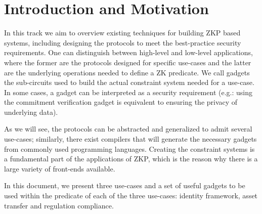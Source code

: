 \section{Introduction and Motivation}
\label{apps:intro}
 
In this track we aim to overview existing techniques for building ZKP based systems, including designing the protocols to meet the best-practice security requirements. One can distinguish between high-level and low-level applications, where the former are the protocols designed for specific use-cases and the latter are the underlying operations needed to define a ZK predicate. We call gadgets the sub-circuits used to build the actual constraint system needed for a use-case. In some cases, a gadget can be interpreted as a security requirement (e.g.: using the commitment verification gadget is equivalent to ensuring the privacy of underlying data). 

As we will see, the protocols can be abstracted and generalized to admit several use-cases; similarly, there exist compilers that will generate the necessary gadgets from commonly used programming languages. Creating the constraint systems is a fundamental part of the applications of ZKP, which is the reason why there is a large variety of front-ends available.

In this document, we present three use-cases and a set of useful gadgets to be used within the predicate of each of the three use-cases: identity framework, asset transfer and regulation compliance.

